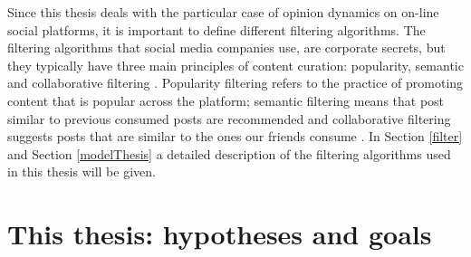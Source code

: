 \documentclass[11 pt , letterpaper , twoside , openright]{book}
\begin{document}
\newline
Since this thesis deals with the particular case of opinion dynamics on on-line social platforms, it is important to define different filtering algorithms. The filtering algorithms that social media companies use, are corporate secrets, but they typically have three main principles of content curation: popularity, semantic and collaborative filtering \cite{Perra2019}. Popularity filtering refers to the practice of promoting content that is popular across the platform; semantic filtering means that post similar to previous consumed posts are recommended and collaborative filtering suggests posts that are similar to the ones our friends consume \cite{Perra2019}. In Section \ref{filter} and Section \ref{modelThesis} a detailed description of the filtering algorithms used in this thesis will be given.
\newpage
\section{This thesis: hypotheses and goals}\label{goal}
\end{document}
